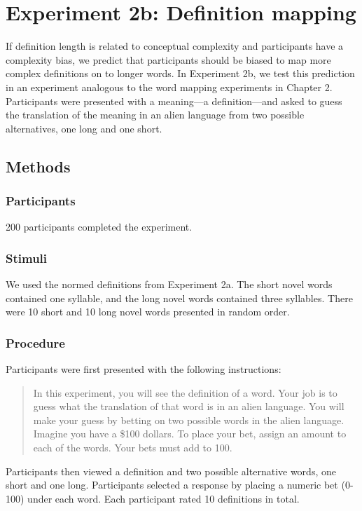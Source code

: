 \section{Experiment 2b: Definition mapping}
If definition length is related to conceptual complexity and participants have a complexity bias, we predict that participants should be biased to map more complex definitions on to longer words. In Experiment 2b, we test this prediction in an experiment analogous to the word mapping experiments in Chapter 2. Participants were presented with a meaning---a definition---and asked to guess the translation of the meaning in an alien language from two possible alternatives, one long and one short. 

\subsection{Methods}
\subsubsection{Participants} 
200 participants completed the experiment.
\subsubsection{Stimuli} 
We used the normed definitions from Experiment 2a. The short novel words contained one syllable, and the long novel words contained three syllables. There were 10 short and 10 long novel words presented in random order. 

\subsubsection{Procedure}
Participants were first presented with the following instructions:
\begin{quote}
In this experiment, you will see the definition of a word. Your job is to guess what the translation of that word is in an alien language. You will make your guess by betting on two possible words in the alien language. Imagine you have a \$100 dollars. To place your bet, assign an amount to each of the words. Your bets must add to 100.
\end{quote}
Participants then viewed a definition and two possible alternative words, one short and one long. Participants selected a response by placing a numeric bet (0-100) under each word.  Each participant rated 10 definitions in total. 


